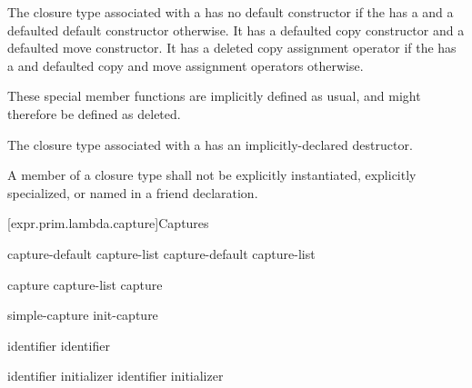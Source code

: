 \pnum
The closure type associated with a  has no
default constructor
if the  has a 
and a defaulted default constructor otherwise.
It has a defaulted copy constructor and a defaulted move constructor.
It has a deleted copy assignment operator if the 
has a  and defaulted copy and move assignment
operators otherwise.
\begin{note} These special member functions are implicitly defined as
usual, and might therefore be defined as deleted. \end{note}

\pnum
The closure type associated with a  has an
implicitly-declared destructor.

\pnum
A member of a closure type shall not be
explicitly instantiated,
explicitly specialized, or
named in a friend declaration.

[expr.prim.lambda.capture]{Captures}%

\begin{bnf}
\br
    capture-default\br
    capture-list\br
    capture-default \terminal{,} capture-list
\end{bnf}

\begin{bnf}
\br
    \terminal{\&}\br
    \terminal{=}
\end{bnf}

\begin{bnf}
\br
    capture \br
    capture-list \terminal{,} capture 
\end{bnf}

\begin{bnf}
\br
    simple-capture\br
    init-capture
\end{bnf}

\begin{bnf}
\br
    identifier\br
    \terminal{\&} identifier\br
    \br
\end{bnf}

\begin{bnf}
\br
    identifier initializer\br
    \terminal{\&} identifier initializer
\end{bnf}

